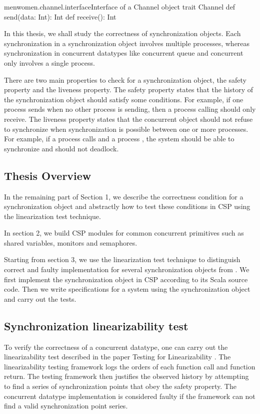 \documentclass[a4paper, 12pt]{article}
\begin{document}
\begin{scalafloat}{menwomen.channel.interface}{Interface of a Channel object}
trait Channel{
  def send(data: Int): Int
  def receive(): Int
}
\end{scalafloat}

In this thesis, we shall study the correctness of synchronization objects. Each synchronization in a synchronization object involves multiple processes, whereas synchronization in concurrent datatypes like concurrent queue and concurrent only involves a single process. 

There are two main properties to check for a synchronization object, the safety property and the liveness property. The safety property states that the history of the synchronization object should satisfy some conditions. For example, if one process sends  when no other process is sending, then a process calling  should only receive. The liveness property states that the concurrent object should not refuse to synchronize when synchronization is possible between one or more processes. For example, if a process calls  and a process , the system should be able to synchronize and should not deadlock. 

\subsection{Thesis Overview}
In the remaining part of Section 1, we describe the correctness condition for a synchronization object and abstractly how to test these conditions in CSP using the linearization test technique. 

In section 2, we build CSP modules for common concurrent primitives such as shared variables, monitors and semaphores.

Starting from section 3, we use the linearization test technique to distinguish correct and faulty implementation for several synchronization objects from \cite{ObjectRepo}. We first implement the synchronization object in CSP according to its Scala source code. Then we write specifications for a system using the synchronization object and carry out the tests.

\subsection{Synchronization linearizability test}
To verify the correctness of a concurrent datatype, one can carry out the linearizability test described in the paper Testing for Linearizability \cite{linearizability-testing}. The linearizability testing framework logs the orders of each function call and function return. The testing framework then justifies the observed history by attempting to find a series of synchronization points that obey the safety property. The concurrent datatype implementation is considered faulty if the framework can not find a valid synchronization point series. 
\end{document}

